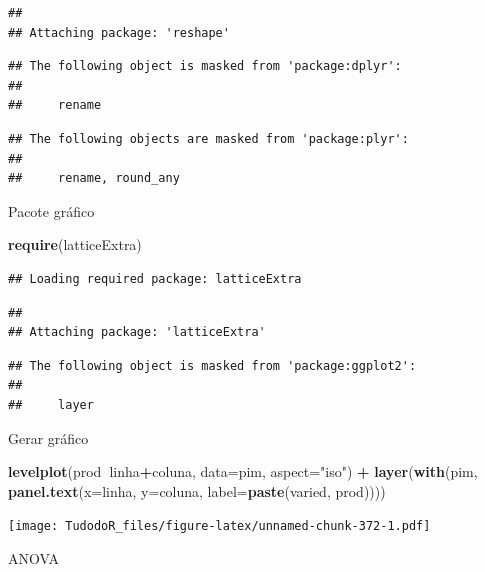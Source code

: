 \documentclass[
]{book}
\newenvironment{Shaded}{\begin{snugshade}}{\end{snugshade}}
\newcommand{\DataTypeTok}[1]{\textcolor[rgb]{0.13,0.29,0.53}{#1}}
\newcommand{\KeywordTok}[1]{\textcolor[rgb]{0.13,0.29,0.53}{\textbf{#1}}}
\newcommand{\NormalTok}[1]{#1}
\newcommand{\OperatorTok}[1]{\textcolor[rgb]{0.81,0.36,0.00}{\textbf{#1}}}
\newcommand{\StringTok}[1]{\textcolor[rgb]{0.31,0.60,0.02}{#1}}
\begin{document}
\begin{verbatim}
## 
## Attaching package: 'reshape'
\end{verbatim}

\begin{verbatim}
## The following object is masked from 'package:dplyr':
## 
##     rename
\end{verbatim}

\begin{verbatim}
## The following objects are masked from 'package:plyr':
## 
##     rename, round_any
\end{verbatim}

Pacote gráfico

\begin{Shaded}
\begin{Highlighting}[]
\KeywordTok{require}\NormalTok{(latticeExtra)}
\end{Highlighting}
\end{Shaded}

\begin{verbatim}
## Loading required package: latticeExtra
\end{verbatim}

\begin{verbatim}
## 
## Attaching package: 'latticeExtra'
\end{verbatim}

\begin{verbatim}
## The following object is masked from 'package:ggplot2':
## 
##     layer
\end{verbatim}

Gerar gráfico

\begin{Shaded}
\begin{Highlighting}[]
\KeywordTok{levelplot}\NormalTok{(prod}\OperatorTok{~}\NormalTok{linha}\OperatorTok{+}\NormalTok{coluna, }\DataTypeTok{data=}\NormalTok{pim, }\DataTypeTok{aspect=}\StringTok{"iso"}\NormalTok{) }\OperatorTok{+}\StringTok{ }
\StringTok{  }\KeywordTok{layer}\NormalTok{(}\KeywordTok{with}\NormalTok{(pim, }\KeywordTok{panel.text}\NormalTok{(}\DataTypeTok{x=}\NormalTok{linha, }\DataTypeTok{y=}\NormalTok{coluna, }\DataTypeTok{label=}\KeywordTok{paste}\NormalTok{(varied, prod))))}
\end{Highlighting}
\end{Shaded}

\texttt{[image: TudodoR\_files/figure-latex/unnamed-chunk-372-1.pdf]}

ANOVA
\end{document}
